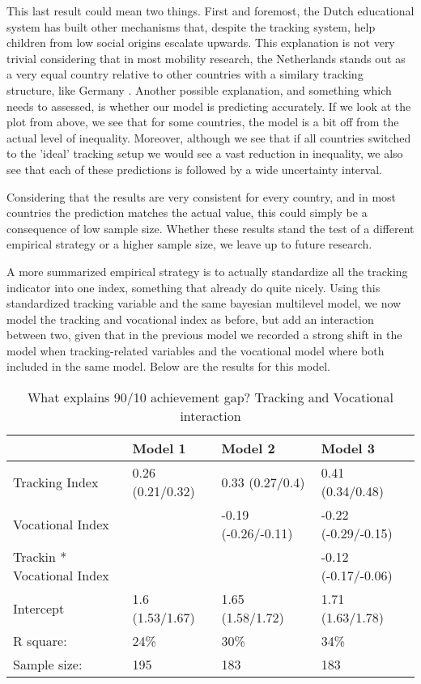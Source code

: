 \documentclass[11pt, a4paper]{article}\usepackage[]{graphicx}\usepackage[]{color}
\begin{document}
This last result could mean two things. First and foremost, the Dutch educational system has built other mechanisms that, despite the tracking system, help children from low social origins escalate upwards. This explanation is not very trivial considering that in most mobility research, the Netherlands stands out as a very equal country relative to other countries with a similary tracking structure, like Germany \citep{shavit1993, esping2012}. Another possible explanation, and something which needs to assessed, is whether our model is predicting accurately. If we look at the plot from above, we see that for some countries, the model is a bit off from the actual level of inequality. Moreover, although we see that if all countries switched to the 'ideal' tracking setup we would see a vast reduction in inequality, we also see that each of these predictions is followed by a wide uncertainty interval. 

Considering that the results are very consistent for every country, and in most countries the prediction matches the actual value, this could simply be a consequence of low sample size. Whether these results stand the test of a different empirical strategy or a higher sample size, we leave up to future research.

A more summarized empirical strategy is to actually standardize all the tracking indicator into one index, something that \citet{bol2013} already do quite nicely. Using this standardized tracking variable and the same bayesian multilevel model, we now model the tracking and vocational index as before, but add an interaction between two, given that in the previous model we recorded a strong shift in the model when tracking-related variables and the vocational model where both included in the same model. Below are the results for this model.



\begin{table}[ht]
\centering
\begin{tabular}{llll}
  \hline
  & Model 1 & Model 2 & Model 3 \\ 
  \hline
Tracking Index & 0.26 (0.21/0.32) & 0.33 (0.27/0.4) & 0.41 (0.34/0.48) \\ 
  Vocational Index &  & -0.19 (-0.26/-0.11) & -0.22 (-0.29/-0.15) \\ 
  Trackin * Vocational Index &  &  & -0.12 (-0.17/-0.06) \\ 
  Intercept & 1.6 (1.53/1.67) & 1.65 (1.58/1.72) & 1.71 (1.63/1.78) \\ 
   \hline R square: & 24\% & 30\% & 34\% \\ Sample size: & 195 & 183 & 183 \\ \hline \hline
\end{tabular}
\caption{What explains 90/10 achievement gap? Tracking and Vocational interaction} 
\end{table}
\end{document}
